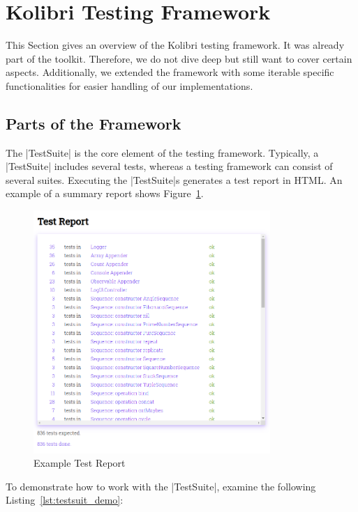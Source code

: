 \section{Kolibri Testing Framework}
\label{sec:Kolibri Test Framework}
This Section gives an overview of the Kolibri testing framework. It was already
part of the toolkit. Therefore, we do not dive deep but still want to cover
certain aspects. Additionally, we extended the framework with some iterable
specific functionalities for easier handling of our implementations.

\subsection{Parts of the Framework}
\label{sub:Parts of the Framework}
The |TestSuite| is the core element of the testing framework. Typically, a
|TestSuite| includes several tests, whereas a testing framework can consist of
several suites. Executing the |TestSuite|s generates a test report in HTML.
An example of a summary report shows Figure~\ref{fig:test_report}.

\begin{figure}[H]
    \centering
    \includegraphics[width=0.8\textwidth]{mainmatter/pictures/test_report.png}
    \caption{Example Test Report}
    \label{fig:test_report}
\end{figure}


To demonstrate how to work with the |TestSuite|, examine the following
Listing~\ref{lst:testsuit_demo}:

